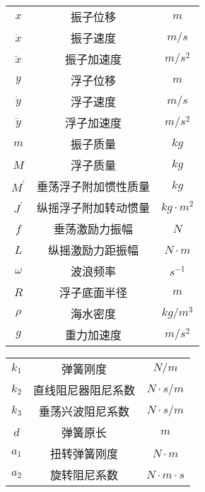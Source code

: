 \documentclass{cumcmthesis}
\begin{document}
	\begin{center}
		\begin{tabular}{ccc}
			\hline
			\makebox[0.3\textwidth][c]{符号}	& 
			\makebox[0.4\textwidth][c]{说明}	&
			\makebox[0.3\textwidth][c]{单位} \\ \hline
			$x$	    	&   振子位移          &   $m$ \\ 
			$\dot{x}$	&   振子速度          &   $m/s$  \\ 
			$\ddot{x}$	&   振子加速度        &   $m/s^2$ \\ 
			$y$	    	&   浮子位移          &   $m$ \\ 
			$\dot{y}$	&   浮子速度          &   $m/s$ \\ 
			$\ddot{y}$	&   浮子加速度        &   $m/s^2$   \\
			$m$	    	&   振子质量          &   $kg$     \\ 
			$M$	    	&   浮子质量          &   $kg$    \\ 
			$M^{\prime}$&   垂荡浮子附加惯性质量&  $kg$  \\ 
			$J^{\prime}$&	纵摇浮子附加转动惯量&  $kg \cdot m^2 $ \\
			$f$	    	&   垂荡激励力振幅     &   $N$  \\ 
			$L$         &   纵摇激励力距振幅   &   $N \cdot m $ \\
			$\omega$	&   波浪频率          &   $s^{-1}$ \\ 
			$R$	    	&   浮子底面半径       &   $m$ \\ 
			$\rho$	    &   海水密度          &   $kg/m^3$ \\ 
			$g$	    	&   重力加速度         &  $m/s^2$  \\\hline
		\end{tabular}
		\newpage
		\begin{tabular}{ccc}
			\hline
			\makebox[0.3\textwidth][c]{符号}	& 
			\makebox[0.4\textwidth][c]{说明}	&
			\makebox[0.3\textwidth][c]{单位} \\ \hline
			$k_1$	    &   弹簧刚度          &   $N/m$  \\
			$k_2$		&   直线阻尼器阻尼系数 &   $N \cdot s/m$    \\
			$k_3$	    &   垂荡兴波阻尼系数   &   $N \cdot s/m$    \\ 
			$d$         &   弹簧原长		  &   $m$     \\
			$a_1$       &   扭转弹簧刚度       &   $ N \cdot m $ \\
			$a_2$       &   旋转阻尼系数       &   $ N \cdot m \cdot s $\\

\end{tabular}
\end{center}
\end{document}

